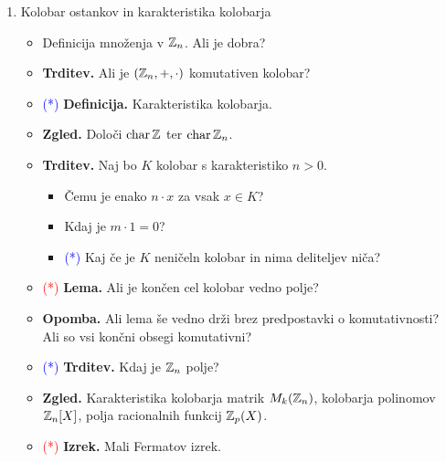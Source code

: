\begin{enumerate}
    \item Kolobar ostankov in karakteristika kolobarja
    \begin{itemize}
        \item Definicija množenja v \(\mathbb{Z}_n\). Ali je dobra?
        \item \textbf{Trditev.} Ali je $(\mathbb{Z}_n, +, \cdot)$ komutativen kolobar?
        \item \textcolor{blue}{(*)} \textbf{Definicija.} Karakteristika kolobarja.
        \item \textbf{Zgled.} Določi \(\operatorname{char} \mathbb{Z}\) ter \(\operatorname{char} \mathbb{Z}_n\).
        \item \textbf{Trditev.} Naj bo \(K\) kolobar s karakteristiko \(n > 0\).
        \begin{itemize}
            \item Čemu je enako \(n \cdot x\) za vsak \(x \in K\)?
            \item Kdaj je \(m \cdot 1 = 0\)?
            \item \textcolor{blue}{(*)} Kaj če je \(K\) neničeln kolobar in nima deliteljev niča?
        \end{itemize}
        \item \textcolor{red}{(*)} \textbf{Lema.} Ali je končen cel kolobar vedno polje?
        \item \textbf{Opomba.} Ali lema še vedno drži brez predpostavki o komutativnosti? Ali so vsi končni obsegi komutativni?
        \item \textcolor{blue}{(*)} \textbf{Trditev.} Kdaj je \(\mathbb{Z}_n\) polje?
        \item \textbf{Zgled.} Karakteristika kolobarja matrik \(M_k(\mathbb{Z}_n)\), kolobarja polinomov \(\mathbb{Z}_n[X]\), polja racionalnih funkcij \(\mathbb{Z}_p(X)\).
        \item \textcolor{red}{(*)} \textbf{Izrek.} Mali Fermatov izrek.
    \end{itemize}


\end{enumerate}
